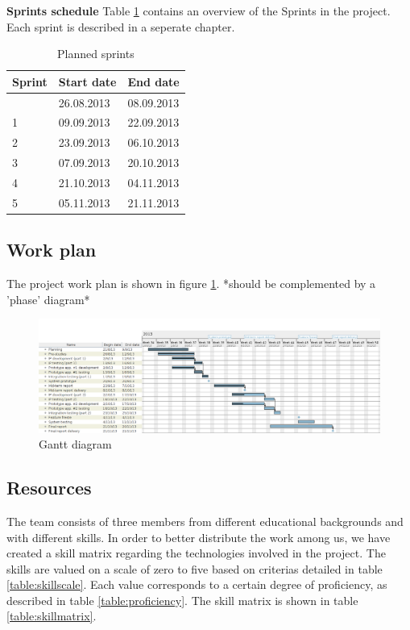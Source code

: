 \textbf{Sprints schedule} \newline
Table \ref{table:sprints} contains an overview of the Sprints in the project.
Each sprint is described in a seperate chapter.

\begin{table}[h]
\begin{center}
\begin{tabular}{ | l | l | l | }
  \hline
  Sprint & Start date & End date \\
  \hline\noalign{\smallskip}\hline
  0 & 26.08.2013 & 08.09.2013 \\ 
  1 & 09.09.2013 & 22.09.2013 \\
  2 & 23.09.2013 & 06.10.2013 \\
  3 & 07.09.2013 & 20.10.2013 \\
  4 & 21.10.2013 & 04.11.2013 \\
  5 & 05.11.2013 & 21.11.2013 \\
  \hline
\end{tabular}
\end{center}
\caption{Planned sprints}
\label{table:sprints}
\end{table}


\subsection{Work plan}
\label{section:workplan}

The project work plan is shown in figure \ref{figure:work-splan}.
*should be complemented by a 'phase' diagram*

\newpage
\begin{landscape}
\begin{figure}[h]
\includegraphics[scale=0.66]{../Figures/gantt-diagram.png}
\caption{Gantt diagram}
\label{figure:work-splan}
\end{figure}
\end{landscape}


\subsection{Resources}
\label{section:resources}
The team consists of three members from different educational backgrounds and with different skills.
In order to better distribute the work among us, we have created a skill matrix regarding the technologies involved
in the project. The skills are valued on a scale of zero to five based on criterias detailed in table
\ref{table:skillscale}. Each value corresponds to a certain degree of proficiency, as described in table
\ref{table:proficiency}. The skill matrix is shown in table \ref{table:skillmatrix}.

